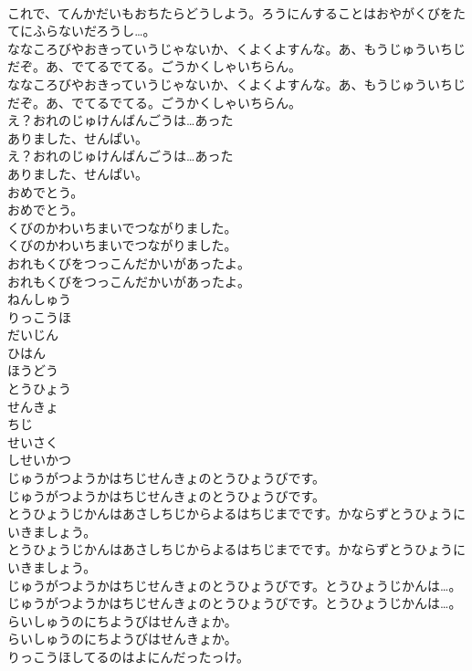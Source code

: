 \documentclass[8pt]{extreport}
\begin{document}
\begin{CJK}{UTF8}{min}
\\	これで、てんかだいもおちたらどうしよう。ろうにんすることはおやがくびをたてにふらないだろうし…。
\\	ななころびやおきっていうじゃないか、くよくよすんな。あ、もうじゅういちじだぞ。あ、でてるでてる。ごうかくしゃいちらん。
\\	ななころびやおきっていうじゃないか、くよくよすんな。あ、もうじゅういちじだぞ。あ、でてるでてる。ごうかくしゃいちらん。
\\	え？おれのじゅけんばんごうは…あった
\\	ありました、せんぱい。
\\	え？おれのじゅけんばんごうは…あった
\\	ありました、せんぱい。
\\	おめでとう。
\\	おめでとう。
\\	くびのかわいちまいでつながりました。
\\	くびのかわいちまいでつながりました。
\\	おれもくびをつっこんだかいがあったよ。
\\	おれもくびをつっこんだかいがあったよ。
\\	ねんしゅう
\\	りっこうほ
\\	だいじん
\\	ひはん
\\	ほうどう
\\	とうひょう
\\	せんきょ
\\	ちじ
\\	せいさく
\\	しせいかつ
\\	じゅうがつようかはちじせんきょのとうひょうびです。
\\	じゅうがつようかはちじせんきょのとうひょうびです。
\\	とうひょうじかんはあさしちじからよるはちじまでです。かならずとうひょうにいきましょう。
\\	とうひょうじかんはあさしちじからよるはちじまでです。かならずとうひょうにいきましょう。
\\	じゅうがつようかはちじせんきょのとうひょうびです。とうひょうじかんは…。
\\	じゅうがつようかはちじせんきょのとうひょうびです。とうひょうじかんは…。
\\	らいしゅうのにちようびはせんきょか。
\\	らいしゅうのにちようびはせんきょか。
\\	りっこうほしてるのはよにんだったっけ。

\end{CJK}
\end{document}
